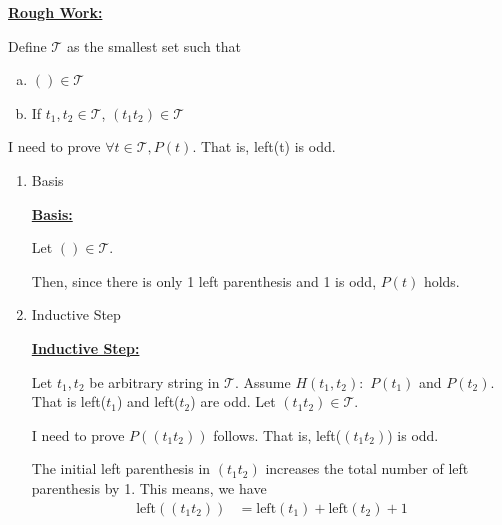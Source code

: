 \documentclass[12pt]{article}
\begin{document}
\begin{mdframed}
    \underline{\textbf{Rough Work:}}

    \bigskip

    Define $\mathcal{T}$ as the smallest set such that

    \begin{enumerate}[a.]
        \item $() \in \mathcal{T}$
        \item If $t_1,t_2 \in \mathcal{T}$, $(t_1t_2) \in \mathcal{T}$
    \end{enumerate}

    \bigskip

    I need to prove $\forall t \in \mathcal{T}, P(t)$. That is,
    left(t) is odd.

    \begin{enumerate}
        \item Basis

        \begin{mdframed}
        \underline{\textbf{Basis:}}

        \bigskip

        Let $() \in \mathcal{T}$.

        \bigskip

        Then, since there is only 1 left parenthesis and 1 is odd,
        $P(t)$ holds.
        \end{mdframed}

        \item Inductive Step

        \begin{mdframed}
        \underline{\textbf{Inductive Step:}}

        \bigskip

        Let $t_1,t_2$ be arbitrary string in $\mathcal{T}$. Assume
        $H(t_1,t_2):$ $P(t_1)$ and $P(t_2)$. That is left($t_1$) and left($t_2$)
        are odd. Let $(t_1t_2) \in \mathcal{T}$.

        \bigskip

        I need to prove $P((t_1t_2))$ follows. That is, left($(t_1t_2)$) is odd.

        \bigskip

        The initial left parenthesis in $(t_1t_2)$ increases the total number of left
        parenthesis by 1. This means, we have
        \setcounter{equation}{0}
        \begin{align}
            \text{left}((t_1t_2)) &= \text{left}(t_1) + \text{left}(t_2) + 1
        \end{align}


\end{mdframed}
\end{enumerate}
\end{mdframed}
\end{document}
